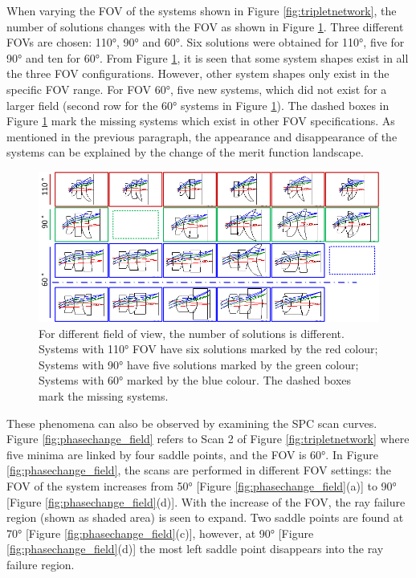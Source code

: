  When varying the FOV of the systems shown in Figure \ref{fig:tripletnetwork}, the number of solutions changes with the FOV as shown in Figure \ref{fig:FOVvarying}. Three different FOVs are chosen: 110°, 90° and 60°. Six solutions were obtained for 110°, five for 90° and ten for 60°. From Figure \ref{fig:FOVvarying}, it is seen that some system shapes exist in all the three FOV configurations. However, other system shapes only exist in the specific FOV range.
For FOV 60°, five new systems, which did not exist for a larger field (second row for the 60° systems in Figure \ref{fig:FOVvarying}). The dashed boxes in Figure \ref{fig:FOVvarying} mark the missing systems which exist in other FOV specifications. As mentioned in the previous paragraph, the appearance and disappearance of the systems can be explained by the change of the merit function landscape. 

\begin{figure}[h!]
    \centering
    \setlength{\belowcaptionskip}{-5pt}
    \includegraphics[width=1.0\textwidth]{chapter-3/figures/FOVvarying.png}
    \caption{For different field of view, the number of solutions is different. Systems with 110° FOV have six solutions marked by the red colour; Systems with 90° have five solutions marked by the green colour; Systems with 60° marked by the blue colour. The dashed boxes mark the missing systems.}
    \label{fig:FOVvarying}
\end{figure}

These phenomena can also be observed by examining the SPC scan curves. Figure \ref{fig:phasechange_field} refers to Scan 2 of Figure \ref{fig:tripletnetwork} where five minima are linked by four saddle points, and the FOV is 60°. In Figure \ref{fig:phasechange_field}, the scans are performed in different FOV settings: the FOV of the system increases from 50° [Figure \ref{fig:phasechange_field}(a)] to 90° [Figure \ref{fig:phasechange_field}(d)]. With the increase of the FOV, the ray failure region (shown as shaded area) is seen to expand. Two saddle points are found at 70° [Figure \ref{fig:phasechange_field}(c)], however, at 90° [Figure \ref{fig:phasechange_field}(d)] the most left saddle point disappears into the ray failure region.

